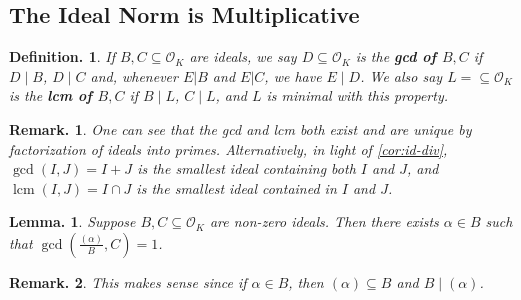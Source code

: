 \documentclass[11pt, a4paper]{memoir}
\theoremstyle{change}
\newtheorem{lemma}[theorem]{Lemma.}
\theoremstyle{plain}
\theoremstyle{nonumberplain}
\newtheorem{definition}{Definition.}
\newtheorem{remark}{Remark.}
\DeclareMathOperator{\lcm}{lcm}
\newcommand{\mbf}[1]{{\boldmath\bfseries #1}}
\numberwithin{equation}{section}
\begin{document}
\subsection{The Ideal Norm is Multiplicative}
\begin{definition}
    If $B,C\subseteq\mathcal{O}_K$ are ideals, we say $D\subseteq\mathcal{O}_K$ is the \mbf{gcd of $B,C$} if $D\mid B$, $D\mid C$ and, whenever $E|B$ and $E|C$, we have $E\mid D$.
    We also say $L=\subseteq\mathcal{O}_K$ is the \mbf{lcm of $B,C$} if $B\mid L$, $C\mid L$, and $L$ is minimal with this property.
\end{definition}
\begin{remark}
    One can see that the gcd and lcm both exist and are unique by factorization of ideals into primes.
    Alternatively, in light of \cref{cor:id-div}, $\gcd(I,J)=I+J$ is the smallest ideal containing both $I$ and $J$, and $\lcm(I,J)=I\cap J$ is the smallest ideal contained in $I$ and $J$.
\end{remark}
\begin{lemma}\label{l:gcd-pr}
    Suppose $B,C\subseteq\mathcal{O}_K$ are non-zero ideals.
    Then there exists $\alpha\in B$ such that $\gcd\left(\frac{(\alpha)}{B},C\right)=1$.
\end{lemma}
\begin{remark}
    This makes sense since if $\alpha\in B$, then $(\alpha)\subseteq B$ and $B\mid (\alpha)$.
\end{remark}
\end{document}
